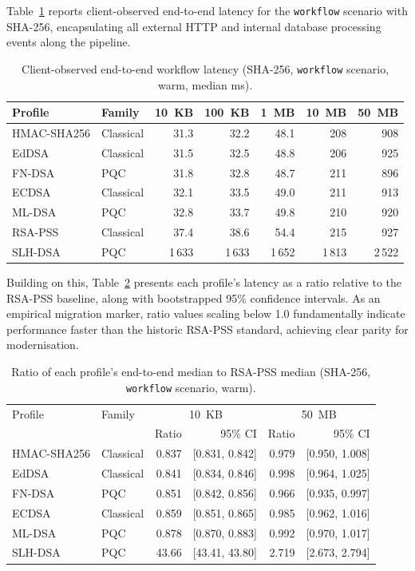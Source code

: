\documentclass[12pt,a4paper]{article}
\begin{document}
Table~\ref{tab:e2e_latency} reports client-observed end-to-end latency for the \texttt{workflow} scenario with SHA-256, encapsulating all external HTTP and internal database processing events along the pipeline.

\begin{table}[H]
\centering
\caption[Client-observed end-to-end workflow latency]{Client-observed end-to-end workflow latency (SHA-256,
         \texttt{workflow} scenario, warm, median ms).}
\label{tab:e2e_latency}
\begin{tabular}{l l rrrrr}
\toprule
Profile & Family & 10~KB & 100~KB & 1~MB & 10~MB & 50~MB \\
\midrule
HMAC-SHA256 & Classical & 31.3 & 32.2 & 48.1 & 208 & 908 \\
EdDSA       & Classical & 31.5 & 32.5 & 48.8 & 206 & 925 \\
FN-DSA      & PQC       & 31.8 & 32.8 & 48.7 & 211 & 896 \\
ECDSA       & Classical & 32.1 & 33.5 & 49.0 & 211 & 913 \\
ML-DSA      & PQC       & 32.8 & 33.7 & 49.8 & 210 & 920 \\
RSA-PSS     & Classical & 37.4 & 38.6 & 54.4 & 215 & 927 \\
SLH-DSA     & PQC       & 1\,633 & 1\,633 & 1\,652 & 1\,813 & 2\,522 \\
\bottomrule
\end{tabular}
\end{table}

Building on this, Table~\ref{tab:e2e_ratio} presents each profile's latency as a ratio relative to the RSA-PSS baseline, along with bootstrapped 95\% confidence intervals. As an empirical migration marker, ratio values scaling below 1.0 fundamentally indicate performance faster than the historic RSA-PSS standard, achieving clear parity for modernisation.

\begin{table}[H]
\centering
\caption{Ratio of each profile's end-to-end median to RSA-PSS median
         (SHA-256, \texttt{workflow} scenario, warm).}
\label{tab:e2e_ratio}
\begin{tabular}{l l rr rr}
\toprule
Profile & Family & \multicolumn{2}{c}{10~KB} & \multicolumn{2}{c}{50~MB} \\
 & & Ratio & 95\% CI & Ratio & 95\% CI \\
\midrule
HMAC-SHA256 & Classical & 0.837 & [0.831, 0.842] & 0.979 & [0.950, 1.008] \\
EdDSA       & Classical & 0.841 & [0.834, 0.846] & 0.998 & [0.964, 1.025] \\
FN-DSA      & PQC       & 0.851 & [0.842, 0.856] & 0.966 & [0.935, 0.997] \\
ECDSA       & Classical & 0.859 & [0.851, 0.865] & 0.985 & [0.962, 1.016] \\
ML-DSA      & PQC       & 0.878 & [0.870, 0.883] & 0.992 & [0.970, 1.017] \\
SLH-DSA     & PQC       & 43.66 & [43.41, 43.80] & 2.719 & [2.673, 2.794] \\
\bottomrule
\end{tabular}
\end{table}
\end{document}

